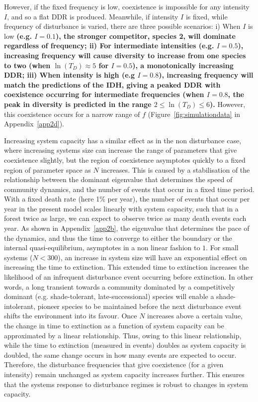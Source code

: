 However, if the fixed frequency is low, coexistence is impossible for any intensity $I$, and so a flat DDR is produced. Meanwhile, if intensity $I$ is fixed, while frequency of disturbance is varied, there are three possible scenarios: i) When $I$ is low \textbf{(e.g. $I=0.1$), the stronger competitor, species 2, will dominate regardless of frequency; ii) For intermediate intensities (e.g. $I=0.5$), increasing frequency will cause diversity to increase from one species to two (when $\ln(T_D)\approx 5$ for $I=0.5$), a monotonically increasing DDR; iii) When intensity is high (e.g $I=0.8$), increasing frequency will match the predictions of the IDH, giving a peaked DDR with coexistence occurring for intermediate frequencies (when $I=0.8$, the peak in diversity is predicted in the range $2\leq \ln(T_D) \leq 6$).} However, this coexistence occurs for a narrow range of $f$ (Figure~\ref{fig:simulationdata} in Appendix~\ref{app2d}). 

Increasing system capacity has a similar effect as in the non disturbance case, where increasing systems size can increase the range of parameters that give coexistence slightly, but the region of coexistence asymptotes quickly to a fixed region of parameter space as $N$ increases. This is caused by a stabilisation of the relationship between the dominant eigenvalue that determines the speed of community dynamics, and the number of events that occur in a fixed time period. With a fixed death rate (here 1\% per year), the number of events that occur per year in the present model scales linearly with system capacity, such that in a forest twice as large, we can expect to observe twice as many death events each year. As shown in Appendix~\ref{app2b}, the eigenvalue that determines the pace of the dynamics, and thus the time to converge to either the boundary or the internal quasi-equilibrium, asymptotes in a non linear fashion to $1$. For small systems ($N<300$), an increase in system size will have an exponential effect on increasing the time to extinction. This extended time to extinction increases the likelihood of an infrequent disturbance event occurring before extinction. In other words, a long transient towards a community dominated by a competitively dominant (e.g. shade-tolerant, late-successional) species will enable a shade-intolerant, pioneer species to be maintained before the next disturbance event shifts the environment into its favour. Once $N$ increases above a certain value, the change in time to extinction as a function of system capacity can be approximated by a linear relationship. Thus, owing to this linear relationship, while the time to extinction (measured in events) doubles as system capacity is doubled, the same change occurs in how many events are expected to occur. Therefore, the disturbance frequencies that give coexistence (for a given intensity) remain unchanged as system capacity increases further. This ensures that the systems response to disturbance regimes is robust to changes in system capacity.

